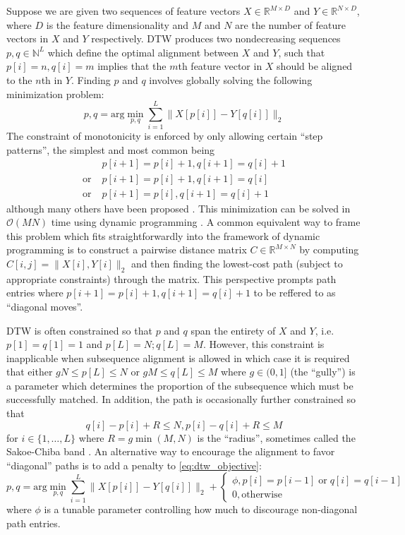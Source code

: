 Suppose we are given two sequences of feature vectors $X \in \mathbb{R}^{M \times D}$ and $Y \in \mathbb{R}^{N \times D}$, where $D$ is the feature dimensionality and $M$ and $N$ are the number of feature vectors in $X$ and $Y$ respectively.
DTW produces two nondecreasing sequences $p, q \in \mathbb{N}^L$ which define the optimal alignment between $X$ and $Y$, such that $p[i] = n, q[i] = m$ implies that the $m$th feature vector in $X$ should be aligned to the $n$th in $Y$.
Finding $p$ and $q$ involves globally solving the following minimization problem:
\begin{equation}
p, q = \mathrm{arg}\min_{p, q} \sum_{i = 1}^{L} \|X[p[i]] - Y[q[i]]\|_2
\label{eq:dtw_objective}
\end{equation}
The constraint of monotonicity is enforced by only allowing certain ``step patterns'', the simplest and most common being
\begin{align}
                      & p[i + 1] = p[i] + 1, q[i + 1] = q[i] + 1 \\
        \label{eq:diagonal}
        \mathrm{or\;} & p[i + 1] = p[i] + 1, q[i + 1] = q[i] \\
        \mathrm{or\;} & p[i + 1] = p[i], q[i + 1] = q[i] + 1
\end{align}
although many others have been proposed \cite{muller2007dynamic, sakoe1978dynamic}.
This minimization can be solved in $\mathcal{O}(MN)$ time using dynamic programming \cite{sakoe1978dynamic}.
A common equivalent way to frame this problem which fits straightforwardly into the framework of dynamic programming is to construct a pairwise distance matrix $C \in \mathbb{R}^{M \times N}$ by computing $C[i, j] = \|X[i], Y[i]\|_2$ and then finding the lowest-cost path (subject to appropriate constraints) through the matrix.
This perspective prompts path entries where $p[i + 1] = p[i] + 1, q[i + 1] = q[i] + 1$ to be reffered to as ``diagonal moves''.

DTW is often constrained so that $p$ and $q$ span the entirety of $X$ and $Y$, i.e.\ $p[1] = q[1] = 1$ and $p[L] = N; q[L] = M$.
However, this constraint is inapplicable when subsequence alignment is allowed in which case it is required that either $gN \le p[L] \le N$ or $gM \le q[L] \le M$ where $g \in (0, 1]$ (the ``gully'') is a parameter which determines the proportion of the subsequence which must be successfully matched.
In addition, the path is occasionally further constrained so that
$$
q[i] - p[i] + R \le N, p[i] - q[i] + R \le M
$$
for $i \in \{1, \ldots, L\}$ where $R = g\min(M, N)$ is the ``radius'', sometimes called the Sakoe-Chiba band \cite{sakoe1978dynamic}.
An alternative way to encourage the alignment to favor ``diagonal'' paths is to add a penalty to \cref{eq:dtw_objective}:
\begin{equation}
        p, q = \mathrm{arg}\min_{p, q} \sum_{i = 1}^{L} \|X[p[i]] - Y[q[i]]\|_2 + \begin{cases}
                \phi, p[i] = p[i - 1] \mathrm{\;or\;} q[i] = q[i - 1]\\
                0, \mathrm{otherwise}
        \end{cases}
\end{equation}
where $\phi$ is a tunable parameter controlling how much to discourage non-diagonal path entries.

